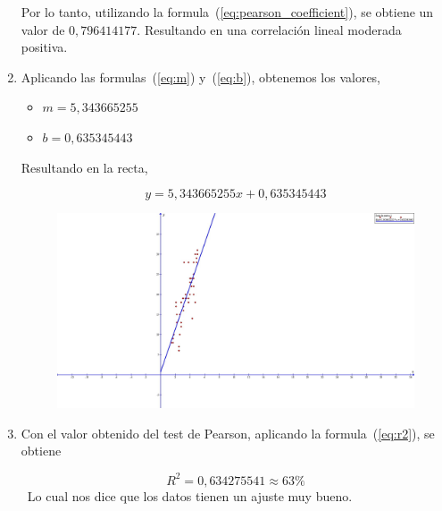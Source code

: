 \documentclass[conference]{IEEEtran}
\begin{document}
\begin{enumerate}
	      Por lo tanto, utilizando la formula~(\ref{eq:pearson_coefficient}),
	      se obtiene un valor de $0,796414177$. Resultando en una correlación
	      lineal moderada positiva.

	\item Aplicando las formulas~(\ref{eq:m}) y~(\ref{eq:b}), obtenemos los
	      valores,

	      \begin{itemize}
		      \item $m = 5,343665255$
		      \item $b = 0,635345443$
	      \end{itemize}

	      Resultando en la recta,

	      \begin{equation*}
		      y = 5,343665255 x + 0,635345443
	      \end{equation*}

	      \begin{figure}[H]
		      \begin{center}
			      \includegraphics[width=\linewidth]{./Images/Recta.jpg}
		      \end{center}
	      \end{figure}

	\item Con el valor obtenido del test de Pearson, aplicando la
	      formula~(\ref{eq:r2}), se obtiene

	      \begin{equation*}
		      R^2 = 0,634275541 \approx 63\%
	      \end{equation*}
	      \
	      Lo cual nos dice que los datos tienen un ajuste muy bueno.

\end{enumerate}


\end{document}
